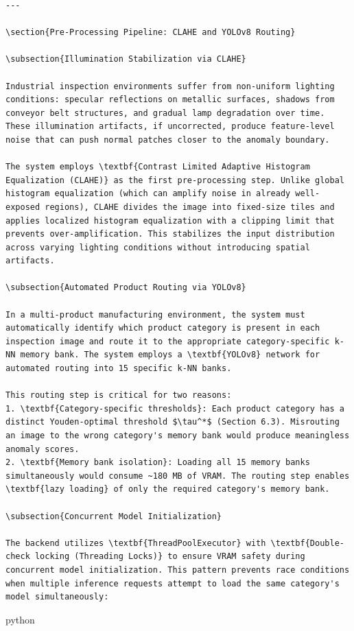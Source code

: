 \documentclass[12pt,a4paper,oneside]{report}
\begin{document}
\begin{verbatim}
---

\section{Pre-Processing Pipeline: CLAHE and YOLOv8 Routing}

\subsection{Illumination Stabilization via CLAHE}

Industrial inspection environments suffer from non-uniform lighting conditions: specular reflections on metallic surfaces, shadows from conveyor belt structures, and gradual lamp degradation over time. These illumination artifacts, if uncorrected, produce feature-level noise that can push normal patches closer to the anomaly boundary.

The system employs \textbf{Contrast Limited Adaptive Histogram Equalization (CLAHE)} as the first pre-processing step. Unlike global histogram equalization (which can amplify noise in already well-exposed regions), CLAHE divides the image into fixed-size tiles and applies localized histogram equalization with a clipping limit that prevents over-amplification. This stabilizes the input distribution across varying lighting conditions without introducing spatial artifacts.

\subsection{Automated Product Routing via YOLOv8}

In a multi-product manufacturing environment, the system must automatically identify which product category is present in each inspection image and route it to the appropriate category-specific k-NN memory bank. The system employs a \textbf{YOLOv8} network for automated routing into 15 specific k-NN banks.

This routing step is critical for two reasons:
1. \textbf{Category-specific thresholds}: Each product category has a distinct Youden-optimal threshold $\tau^*$ (Section 6.3). Misrouting an image to the wrong category's memory bank would produce meaningless anomaly scores.
2. \textbf{Memory bank isolation}: Loading all 15 memory banks simultaneously would consume ~180 MB of VRAM. The routing step enables \textbf{lazy loading} of only the required category's memory bank.

\subsection{Concurrent Model Initialization}

The backend utilizes \textbf{ThreadPoolExecutor} with \textbf{Double-check locking (Threading Locks)} to ensure VRAM safety during concurrent model initialization. This pattern prevents race conditions when multiple inference requests attempt to load the same category's model simultaneously:

\end{verbatim}python
\end{document}
